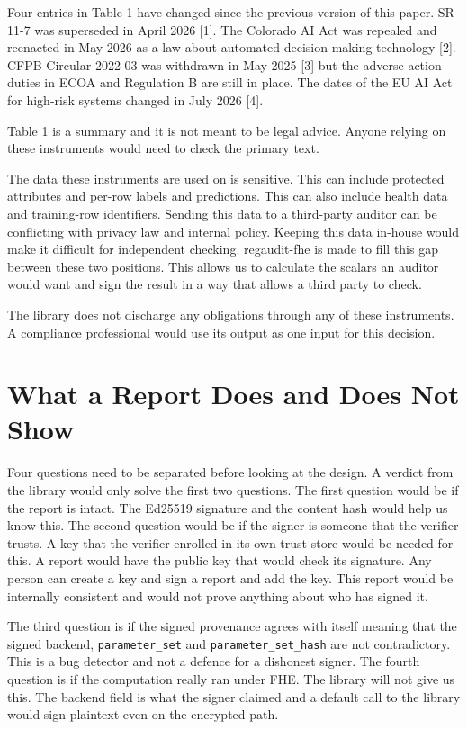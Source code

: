 \documentclass[10pt,a4paper]{article}
\begin{document}
Four entries in Table 1 have changed since the previous version of this paper. SR 11-7 was superseded in April 2026 [1]. The Colorado AI Act was repealed and reenacted in May 2026 as a law about automated decision-making technology [2]. CFPB Circular 2022-03 was withdrawn in May 2025 [3] but the adverse action duties in ECOA and Regulation B are still in place. The dates of the EU AI Act for high-risk systems changed in July 2026 [4].

Table 1 is a summary and it is not meant to be legal advice. Anyone relying on these instruments would need to check the primary text.

The data these instruments are used on is sensitive. This can include protected attributes and per-row labels and predictions. This can also include health data and training-row identifiers. Sending this data to a third-party auditor can be conflicting with privacy law and internal policy. Keeping this data in-house would make it difficult for independent checking. regaudit-fhe is made to fill this gap between these two positions. This allows us to calculate the scalars an auditor would want and sign the result in a way that allows a third party to check.

The library does not discharge any obligations through any of these instruments. A compliance professional would use its output as one input for this decision.

\section{What a Report Does and Does Not Show}

Four questions need to be separated before looking at the design. A verdict from the library would only solve the first two questions. The first question would be if the report is intact. The Ed25519 signature and the content hash would help us know this. The second question would be if the signer is someone that the verifier trusts. A key that the verifier enrolled in its own trust store would be needed for this. A report would have the public key that would check its signature. Any person can create a key and sign a report and add the key. This report would be internally consistent and would not prove anything about who has signed it.

The third question is if the signed provenance agrees with itself meaning that the signed backend, \texttt{parameter\_set} and \texttt{parameter\_set\_hash} are not contradictory. This is a bug detector and not a defence for a dishonest signer. The fourth question is if the computation really ran under FHE. The library will not give us this. The backend field is what the signer claimed and a default call to the library would sign plaintext even on the encrypted path.
\end{document}
